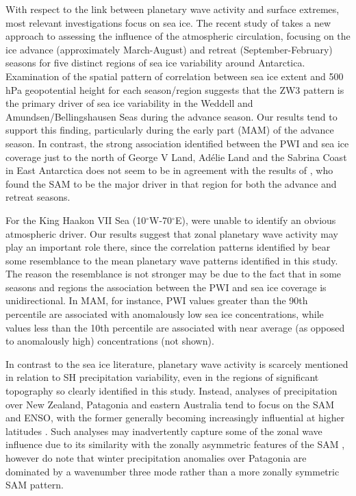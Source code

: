 With respect to the link between planetary wave activity and surface extremes, most relevant investigations focus on sea ice. The recent study of \citet{Raphael2014} takes a new approach to assessing the influence of the atmospheric circulation, focusing on the ice advance (approximately March-August) and retreat (September-February) seasons for five distinct regions of sea ice variability around Antarctica. Examination of the spatial pattern of correlation between sea ice extent and 500 hPa geopotential height for each season/region suggests that the ZW3 pattern is the primary driver of sea ice variability in the Weddell and Amundsen/Bellingshausen Seas during the advance season. Our results tend to support this finding, particularly during the early part (MAM) of the advance season. In contrast, the strong association identified between the PWI and sea ice coverage just to the north of George V Land, Ad{\'e}lie Land and the Sabrina Coast in East Antarctica does not seem to be in agreement with the results of \citet{Raphael2014}, who found the SAM to be the major driver in that region for both the advance and retreat seasons. 

For the King Haakon VII Sea (10$^{\circ}$W-70$^{\circ}$E), \citet{Raphael2014} were unable to identify an obvious atmospheric driver. Our results suggest that zonal planetary wave activity may play an important role there, since the correlation patterns identified by \citet{Raphael2014} bear some resemblance to the mean planetary wave patterns identified in this study. The reason the resemblance is not stronger may be due to the fact that in some seasons and regions the association between the PWI and sea ice coverage is unidirectional. In MAM, for instance, PWI values greater than the 90th percentile are associated with anomalously low sea ice concentrations, while values less than the 10th percentile are associated with near average (as opposed to anomalously high) concentrations (not shown).

In contrast to the sea ice literature, planetary wave activity is scarcely mentioned in relation to SH precipitation variability, even in the regions of significant topography so clearly identified in this study. Instead, analyses of precipitation over New Zealand, Patagonia and eastern Australia tend to focus on the SAM and ENSO, with the former generally becoming increasingly influential at higher latitudes \citep[e.g.][]{Ummenhofer2007,Aravena2009,Kidston2009,Risbey2009,Garreaud2013,Jiang2013}. Such analyses may inadvertently capture some of the zonal wave influence due to its similarity with the zonally asymmetric features of the SAM \citep[e.g.][]{Kidson1988,Kidston2009}, however \citet{Garreaud2013} do note that winter precipitation anomalies over Patagonia are dominated by a wavenumber three mode rather than a more zonally symmetric SAM pattern.

